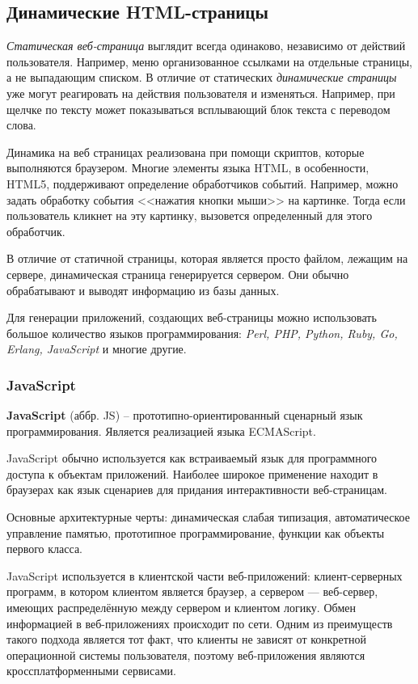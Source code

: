 \documentclass[a4paper]{article}
\begin{document}
\subsection{Динамические HTML-страницы}

\textit{Статическая веб-страница} выглядит всегда одинаково, независимо от действий пользователя. Например, меню организованное ссылками на отдельные страницы, а не выпадающим списком. В отличие от статических \textit{динамические страницы} уже могут реагировать на действия пользователя и изменяться. Например, при щелчке по тексту может показываться всплывающий блок текста с переводом слова.

Динамика на веб страницах реализована при помощи скриптов, которые выполняются браузером. Многие элементы языка HTML, в особенности, HTML5, поддерживают определение обработчиков событий. Например, можно задать обработку события <<нажатия кнопки мыши>> на картинке. Тогда если пользователь кликнет на эту картинку, вызовется определенный для этого обработчик.

В отличие от статичной страницы, которая является просто файлом, лежащим на сервере, динамическая страница генерируется сервером. Они обычно обрабатывают и выводят информацию из базы данных.

Для генерации приложений, создающих веб-страницы можно использовать большое количество языков программирования: \textit{Perl, PHP, Python, Ruby, Go, Erlang, JavaScript} и многие другие. 

\subsubsection{JavaScript}

\textbf{JavaScript} (аббр. JS) -- прототипно-ориентированный сценарный язык программирования. Является реализацией языка ECMAScript.

JavaScript обычно используется как встраиваемый язык для программного доступа к объектам приложений. Наиболее широкое применение находит в браузерах как язык сценариев для придания интерактивности веб-страницам.

Основные архитектурные черты: динамическая слабая типизация, автоматическое управление памятью, прототипное программирование, функции как объекты первого класса.

JavaScript используется в клиентской части веб-приложений: клиент-серверных программ, в котором клиентом является браузер, а сервером — веб-сервер, имеющих распределённую между сервером и клиентом логику. Обмен информацией в веб-приложениях происходит по сети. Одним из преимуществ такого подхода является тот факт, что клиенты не зависят от конкретной операционной системы пользователя, поэтому веб-приложения являются кроссплатформенными сервисами.
\end{document}
